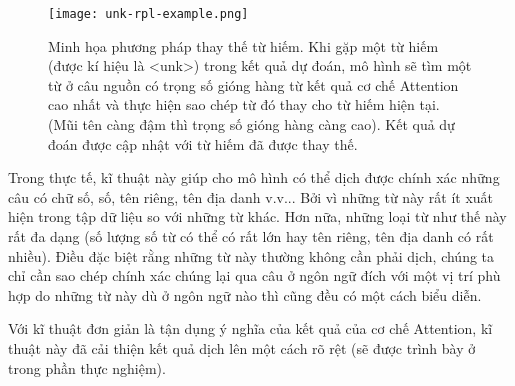 \begin{figure}
	\centering
	\texttt{[image: unk-rpl-example.png]}
	\caption[Minh họa kĩ thuật thay thế từ hiếm.]{Minh họa phương pháp thay thế từ hiếm. Khi gặp một từ hiếm (được kí hiệu là <unk>) trong kết quả dự đoán, mô hình sẽ tìm một từ ở câu nguồn có trọng số gióng hàng từ kết quả cơ chế Attention cao nhất và thực hiện sao chép từ đó thay cho từ hiếm hiện tại. (Mũi tên càng đậm thì trọng số gióng hàng càng cao). Kết quả dự đoán được cập nhật với từ hiếm đã được thay thế. }
	\label{fig_unk_rpl_example}
\end{figure}
Trong thực tế, kĩ thuật này giúp cho mô hình có thể dịch được chính xác những câu có chữ số, số, tên riêng, tên địa danh v.v... Bởi vì những từ này rất ít xuất hiện trong tập dữ liệu so với những từ khác. Hơn nữa, những loại từ như thế này rất đa dạng (số lượng số từ có thể có rất lớn hay tên riêng, tên địa danh có rất nhiều). Điều đặc biệt rằng những từ này thường không cần phải dịch, chúng ta chỉ cần sao chép chính xác chúng lại qua câu ở ngôn ngữ đích với một vị trí phù hợp do những từ này dù ở ngôn ngữ nào thì cũng đều có một cách biểu diễn.

Với kĩ thuật đơn giản là tận dụng ý nghĩa của kết quả của cơ chế Attention, kĩ thuật này đã cải thiện kết quả dịch lên một cách rõ rệt (sẽ được trình bày ở trong phần thực nghiệm).